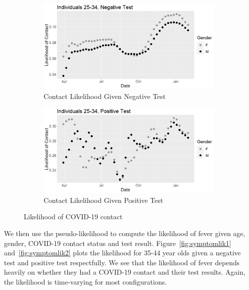 \documentclass[11pt]{amsart}
\numberwithin{equation}{section}
\theoremstyle{plain}
\begin{document}
\begin{figure}[!th]
\centering
\begin{subfigure}{.5\textwidth}
 \centering
 \includegraphics[width=.9\linewidth]{../figs/tvprop_contact_fig1.png}
 \caption{Contact Likelihood Given Negative Test}
 \label{fig:contactlik1}
\end{subfigure}%
\begin{subfigure}{.5\textwidth}
 \centering
\includegraphics[width=.9\linewidth]{../figs/tvprop_contact_fig2.png}
 \caption{Contact Likelihood Given Positive Test}
 \label{fig:contactlik2}
\end{subfigure}
\caption{Likelihood of COVID-19 contact}
\label{fig:contactlik}
\end{figure}

We then use the pseudo-likelihood to compute the likelihood of fever given age, gender, COVID-19 contact status and test result.  Figure~\ref{fig:symptomlik1} and~\ref{fig:symptomlik2} plots the likelihood for 35-44 year olds given a negative test and positive test respectfully.  We see that the likelihood of fever depends heavily on whether they had a COVID-19 contact and their test results. Again, the likelihood is time-varying for most configurations.
\end{document}

